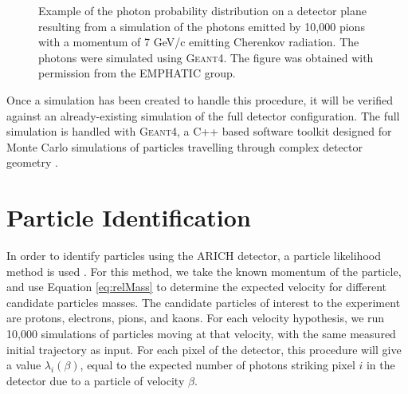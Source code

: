 \begin{figure}[h!]
\centering
{}
\caption[Example of a simulated photon probability distribution]{Example of the photon probability distribution on a detector plane resulting from a simulation of the photons emitted by 10,000 pions with a momentum of 7 GeV/c emitting Cherenkov radiation. The photons were simulated using \textsc{Geant4}. The figure was obtained with permission from the \textsc{EMPHATIC} group.}

\label{fig:particleRings}       %
\end{figure}

Once a simulation has been created to handle this procedure, it will be verified against an already-existing simulation of the full detector configuration.
The full simulation is handled with \textsc{Geant4}, a C++ based software toolkit designed for Monte Carlo simulations of particles travelling through complex detector geometry  \cite{geant4}.

\section{Particle Identification}
\label{sec:particleIdentification}
In order to identify particles using the \ac{ARICH} detector, a particle likelihood method is used \cite{richImpact, belleArich}.
For this method, we take the known momentum of the particle, and use Equation \ref{eq:relMass} to determine the expected velocity for different candidate particles masses.
The candidate particles of interest to the experiment are protons, electrons, pions, and kaons.
For each velocity hypothesis, we run 10,000 simulations of particles moving at that velocity, with the same measured initial trajectory as input.
For each pixel of the detector, this procedure will give a value $\lambda_i(\beta)$, equal to the expected number of photons striking pixel $i$ in the detector due to a particle of velocity $\beta$. 

